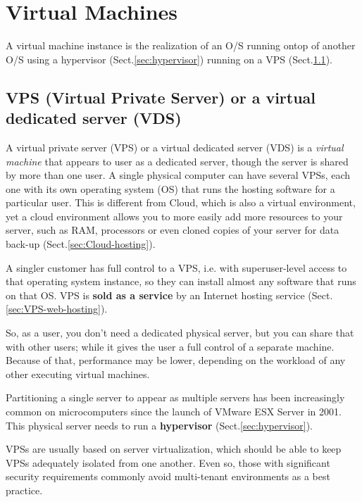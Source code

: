 \chapter{Virtual Machines}
\label{chap:virtual-machine}

A virtual machine instance is the realization of an O/S running ontop of another
O/S using a hypervisor (Sect.\ref{sec:hypervisor}) running on a VPS
(Sect.\ref{sec:VPS}).

\section{VPS (Virtual Private Server) or a virtual dedicated server (VDS)}
\label{sec:VPS}
\label{sec:VDS}

A virtual private server (VPS) or a virtual dedicated server (VDS) is a {\it
virtual machine} that appears to user as a dedicated server, though the server
is shared by more than one user. A single physical computer can have several
VPSs, each one with its own operating system (OS) that runs the hosting software
for a particular user. This is different from Cloud, which is also a virtual
environment, yet a cloud environment allows you to more easily add more
resources to your server, such as RAM, processors or even cloned copies of your
server for data back-up (Sect.\ref{sec:Cloud-hosting}).

A singler customer has full control to a VPS, i.e. with superuser-level access
to that operating system instance, so they can install almost any software that
runs on that OS. VPS is {\bf sold as a service} by an Internet hosting service
(Sect.\ref{sec:VPS-web-hosting}). 

So, as a user, you don't need a dedicated physical server, but you can share
that with other users; while it gives the user a full control of a separate
machine. Because of that, performance may be lower, depending on the workload of
any other executing virtual machines.

Partitioning a single server to appear as multiple servers has been increasingly
common on microcomputers since the launch of VMware ESX Server in 2001. 
This physical server needs to run a {\bf hypervisor}
(Sect.\ref{sec:hypervisor}).

VPSs are usually based on server virtualization, which should be able to keep
VPSs adequately isolated from one another. Even so, those with significant
security requirements commonly avoid multi-tenant environments as a best
practice.  


